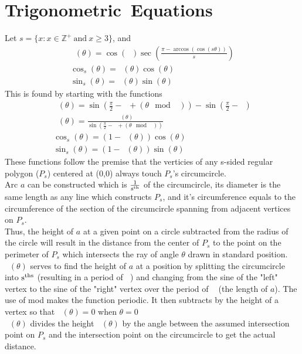 \documentclass[11pt]{article}
\DeclareMathOperator{\custd}{\mathrm{d}_s}
\DeclareMathOperator{\custh}{\mathrm{h}_s}
\DeclareMathOperator{\period}{\frac{2\pi}{s}}
\DeclareMathOperator{\hp}{\frac{\pi}{s}}
\begin{document}
\section{Trigonometric\ Equations}
Let \(s=\{x:x\in\mathbb{Z}^+\ \mathrm{and}\ x\geq3\}\), and
\begin{gather*}
\custd(\theta)=\cos(\hp)\sec(\frac{\pi - \arccos(\cos(s\theta))}{s})\\
\cos_s(\theta)=\custd(\theta)\cos(\theta)\\
\sin_s(\theta)=\custd(\theta)\sin(\theta)
\end{gather*}
This is found by starting with the functions
\begin{gather*}
\custh(\theta)=\sin(\frac{\pi}{2}-\hp+(\theta\mod\period))-\sin(\frac{\pi}{2}-\hp)\\
\custd(\theta)=\frac{\custh(\theta)}{\sin(\frac{\pi}{2}-\hp+(\theta\mod\period))}\\
\cos_s(\theta)=(1-\custd(\theta))\cos(\theta)\\
\sin_s(\theta)=(1-\custd(\theta))\sin(\theta)
\end{gather*}
These functions follow the premise that the verticies of any s-sided regular polygon (\(P_s\)) centered at (0,0) always touch \(P_s\)'s circumcircle. \\
Arc \(a\) can be constructed which is \(\rm \frac{1}{s^{th}}\) of the circumcircle, its diameter is the same length as any line which constructs \(P_s\), and it's circumference equals to the circumference of the section of the circumcircle spanning from adjacent vertices on \(P_s\). \\
Thus, the height of \(a\) at a given point on a circle subtracted from the radius of the circle will result in the distance from the center of \(P_s\) to the point on the perimeter of \(P_s\) which intersects the ray of angle \(\theta\) drawn in standard position.\\
\(\custh(\theta)\) serves to find the height of \(a\) at a position by splitting the circumcircle into \(\rm s^{ths}\) (resulting in a period of \(\period\)) and changing from the sine of the "left" vertex to the sine of the "right" vertex over the period of \(\period\) (the length of \(a\)). The use of mod makes the function periodic. It then subtracts by the height of a vertex so that \(\custh(\theta)=0\) when \(\theta=0\)\\
\(\custd(\theta)\) divides the height \(\custh(\theta)\) by the angle between the assumed intersection point on \(P_s\) and the intersection point on the circumcircle to get the actual distance.\\
\end{document}
